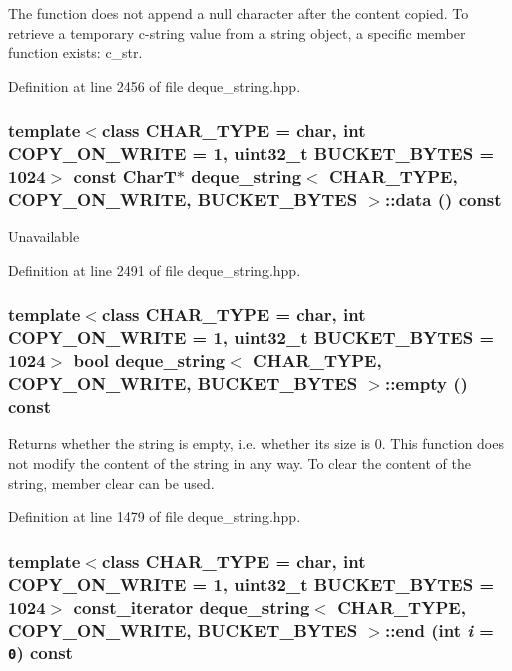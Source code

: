 The function does not append a null character after the content copied. To retrieve a temporary c-string value from a string object, a specific member function exists: c\_\-str. 

Definition at line 2456 of file deque\_\-string.hpp.\hypertarget{classdeque__string_43d0a5c5653559cee6bd477fce3f0a2c}{
\subsubsection[{data}]{\setlength{\rightskip}{0pt plus 5cm}template$<$class CHAR\_\-TYPE  = char, int COPY\_\-ON\_\-WRITE = 1, uint32\_\-t BUCKET\_\-BYTES = 1024$>$ const CharT$\ast$ {\bf deque\_\-string}$<$ CHAR\_\-TYPE, COPY\_\-ON\_\-WRITE, BUCKET\_\-BYTES $>$::data () const}}
\label{classdeque__string_43d0a5c5653559cee6bd477fce3f0a2c}


Unavailable 

Definition at line 2491 of file deque\_\-string.hpp.\hypertarget{classdeque__string_9a087a5f4703f941694db606591f373c}{
\subsubsection[{empty}]{\setlength{\rightskip}{0pt plus 5cm}template$<$class CHAR\_\-TYPE  = char, int COPY\_\-ON\_\-WRITE = 1, uint32\_\-t BUCKET\_\-BYTES = 1024$>$ bool {\bf deque\_\-string}$<$ CHAR\_\-TYPE, COPY\_\-ON\_\-WRITE, BUCKET\_\-BYTES $>$::empty () const}}
\label{classdeque__string_9a087a5f4703f941694db606591f373c}


Returns whether the string is empty, i.e. whether its size is 0. This function does not modify the content of the string in any way. To clear the content of the string, member clear can be used. 

Definition at line 1479 of file deque\_\-string.hpp.\hypertarget{classdeque__string_d0bae9f0e26dae5a1a083fb425c5858a}{
\subsubsection[{end}]{\setlength{\rightskip}{0pt plus 5cm}template$<$class CHAR\_\-TYPE  = char, int COPY\_\-ON\_\-WRITE = 1, uint32\_\-t BUCKET\_\-BYTES = 1024$>$ const\_\-iterator {\bf deque\_\-string}$<$ CHAR\_\-TYPE, COPY\_\-ON\_\-WRITE, BUCKET\_\-BYTES $>$::end (int {\em i} = {\tt 0}) const}}
\label{classdeque__string_d0bae9f0e26dae5a1a083fb425c5858a}


